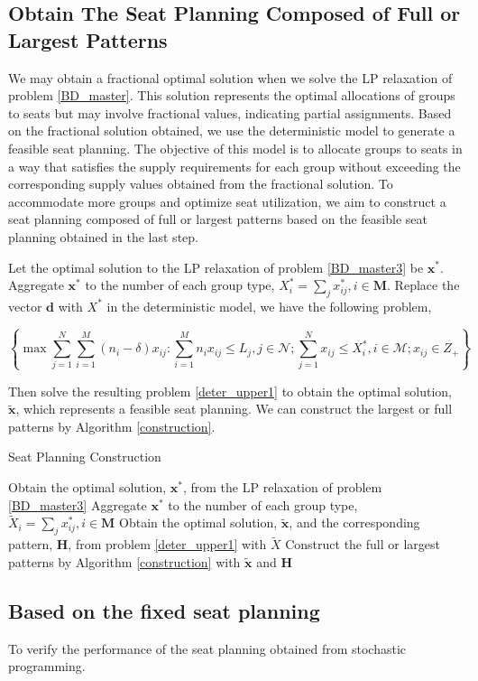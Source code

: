 \subsection{Obtain The Seat Planning Composed of Full or Largest Patterns}\label{seat_assignment}
We may obtain a fractional optimal solution when we solve the LP relaxation of problem \eqref{BD_master}. This solution represents the optimal allocations of groups to seats but may involve fractional values, indicating partial assignments. Based on the fractional solution obtained, we use the deterministic model to generate a feasible seat planning. The objective of this model is to allocate groups to seats in a way that satisfies the supply requirements for each group without exceeding the corresponding supply values obtained from the fractional solution. To accommodate more groups and optimize seat utilization, we aim to construct a seat planning composed of full or largest patterns based on the feasible seat planning obtained in the last step. 


Let the optimal solution to the LP relaxation of problem \eqref{BD_master3} be $\mathbf{x}^{*}$. Aggregate $\mathbf{x}^{*}$ to the number of each group type, ${X}^{*}_{i} =\sum_{j} x^{*}_{ij}, i \in \mathbf{M}$. Replace the vector $\mathbf{d}$ with ${X}^{*}$ in the deterministic model, we have the following problem, 

\begin{equation}\label{deter_upper1}
  \left\{\max \sum_{j=1}^{N} \sum_{i=1}^{M}(n_i -\delta) x_{ij}: \sum_{i = 1}^{M} n_i x_{ij} \leq L_{j}, j \in \mathcal{N}; \sum_{j =1}^{N} x_{ij} \leq {X}^{*}_{i}, i \in \mathcal{M}; x_{ij} \in Z_{+} \right\}
\end{equation}

Then solve the resulting problem \eqref{deter_upper1} to obtain the optimal solution, $\mathbf{\tilde{x}}$, which represents a feasible seat planning. We can construct the largest or full patterns by Algorithm \ref{construction}.

\begin{algorithm}
    \caption{Seat Planning Construction}\label{seat_construction}
      {Obtain the optimal solution, $\mathbf{x}^{*}$, from the LP relaxation of problem \eqref{BD_master3}\;}
      {Aggregate $\mathbf{x}^{*}$ to the number of each group type, $\tilde{X}_{i} = \sum_{j} x^{*}_{ij}, i \in \mathbf{M}$\;}
      {Obtain the optimal solution, $\tilde{\mathbf{x}}$, and the corresponding pattern, $\bm{H}$, from problem \eqref{deter_upper1} with $\tilde{X}$\;}
      {Construct the full or largest patterns by Algorithm \ref{construction} with $\tilde{\mathbf{x}}$ and $\bm{H}$\;}
  \end{algorithm}



\subsection{Based on the fixed seat planning}

To verify the performance of the seat planning obtained from stochastic programming.
